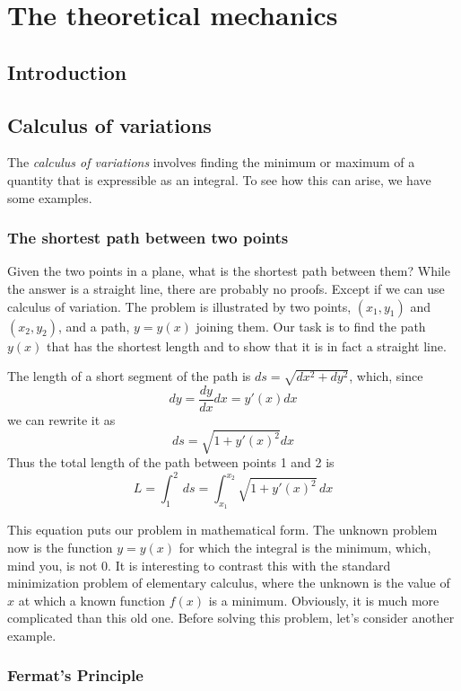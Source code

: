 \chapter{The theoretical mechanics}

\section{Introduction}

\section{Calculus of variations}
The \textit{calculus of variations} involves finding the minimum or maximum of a quantity that is expressible as an integral. To see how this can arise, we have some examples. 

\subsection{The shortest path between two points}

Given the two points in a plane, what is the shortest path between them? While the answer is a straight line, there are probably no proofs. Except if we can use calculus of variation. The problem is illustrated by two points, $(x_{1},y_{1})$ and $(x_{2},y_{2})$, and a path, $y=y(x)$ joining them. Our task is to find the path $y(x)$ that has the shortest length and to show that it is in fact a straight line. 

The length of a short segment of the path is $ds=\sqrt{ dx^{2} +dy^{2}}$, which, since $$dy=\frac{dy}{dx}dx=y'(x)dx$$
we can rewrite it as $$ds=\sqrt{ 1+y'(x)^{2} }dx$$
Thus the total length of the path between points 1 and 2 is $$L=\int_{1}^{2} \, ds = \int_{x_{1}}^{x_{2}} \sqrt{ 1+y'(x)^{2} } \, dx  $$


This equation puts our problem in mathematical form. The unknown problem now is the function $y=y(x)$ for which the integral is the minimum, which, mind you, is not 0. It is interesting to contrast this with the standard minimization problem of elementary calculus, where the unknown is the value of $x$ at which a known function $f(x)$ is a minimum. Obviously, it is much more complicated than this old one. Before solving this problem, let's consider another example. 

\subsection{Fermat's Principle}


